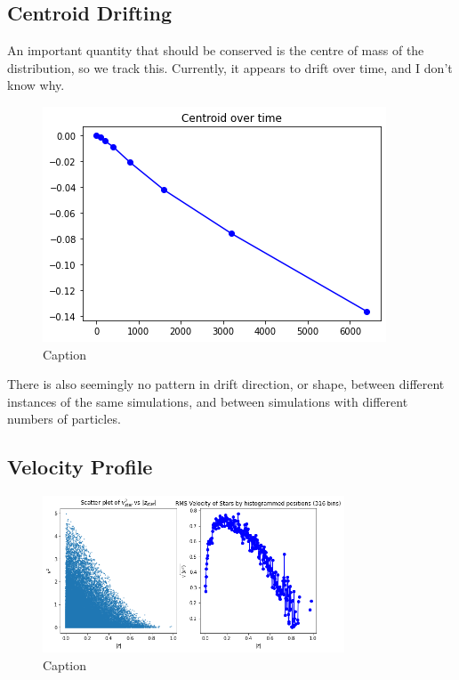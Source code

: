 \documentclass[oneside]{book}
\begin{document}
\subsection{Centroid Drifting}
An important quantity that should be conserved is the centre of mass of the distribution, so we track this. {\color{red}Currently, it appears to drift over time, and I don't know why}.
\begin{figure}[h]
    \centering
    \includegraphics[scale = 0.75]{Images/Centroid.png}
    \caption{Caption}
    \label{Centroid Drift}
\end{figure}
There is also seemingly no pattern in drift direction, or shape, between different instances of the same simulations, and between simulations with different numbers of particles.

\subsection{Velocity Profile}
\begin{figure}[h]
    \centering
    \includegraphics[width = 0.8\textwidth]{Images/VelocityDistribution.png}
    \caption{Caption}
    \label{fig:my_label}
\end{figure}
\end{document}
